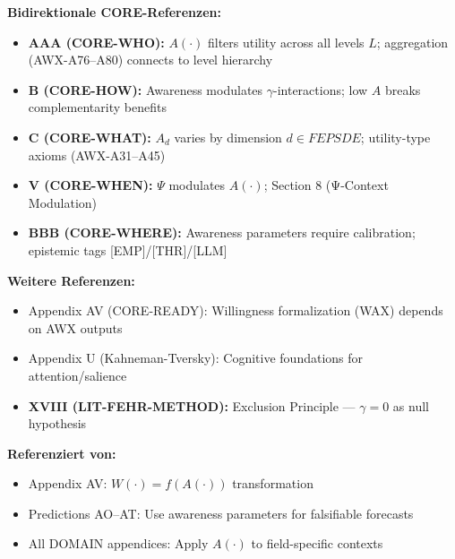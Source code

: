 \begin{tcolorbox}[colback=purple!5!white, colframe=purple!50!black, title=Cross-Reference Map: 9C CORE Integration]
\textbf{Bidirektionale CORE-Referenzen:}
\begin{itemize}[nosep]
    \item \textbf{AAA (CORE-WHO):} $A(\cdot)$ filters utility across all levels $L$; aggregation (AWX-A76--A80) connects to level hierarchy
    \item \textbf{B (CORE-HOW):} Awareness modulates $\gamma$-interactions; low $A$ breaks complementarity benefits
    \item \textbf{C (CORE-WHAT):} $A_d$ varies by dimension $d \in FEPSDE$; utility-type axioms (AWX-A31--A45)
    \item \textbf{V (CORE-WHEN):} $\Psi$ modulates $A(\cdot)$; Section 8 (Ψ-Context Modulation)
    \item \textbf{BBB (CORE-WHERE):} Awareness parameters require calibration; epistemic tags [EMP]/[THR]/[LLM]
\end{itemize}
\textbf{Weitere Referenzen:}
\begin{itemize}[nosep]
    \item Appendix AV (CORE-READY): Willingness formalization (WAX) depends on AWX outputs
    \item Appendix U (Kahneman-Tversky): Cognitive foundations for attention/salience
    \item \textbf{XVIII (LIT-FEHR-METHOD):} Exclusion Principle --- $\gamma = 0$ as null hypothesis
\end{itemize}
\textbf{Referenziert von:}
\begin{itemize}[nosep]
    \item Appendix AV: $W(\cdot) = f(A(\cdot))$ transformation
    \item Predictions AO--AT: Use awareness parameters for falsifiable forecasts
    \item All DOMAIN appendices: Apply $A(\cdot)$ to field-specific contexts
\end{itemize}
\end{tcolorbox}


